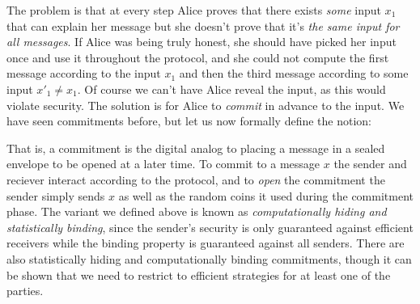 The problem is that at every step Alice proves that there exists
\emph{some} input \(x_1\) that can explain her message but she doesn't
prove that it's \emph{the same input for all messages}. If Alice was
being truly honest, she should have picked her input once and use it
throughout the protocol, and she could not compute the first message
according to the input \(x_1\) and then the third message according to
some input \(x'_1 \neq x_1\). Of course we can't have Alice reveal the
input, as this would violate security. The solution is for Alice to
\emph{commit} in advance to the input. We have seen commitments before,
but let us now formally define the notion:

\hypertarget{commitmentdef}{}

That is, a commitment is the digital analog to placing a message in a
sealed envelope to be opened at a later time. To commit to a message
\(x\) the sender and reciever interact according to the protocol, and to
\emph{open} the commitment the sender simply sends \(x\) as well as the
random coins it used during the commitment phase. The variant we defined
above is known as \emph{computationally hiding and statistically
binding}, since the sender's security is only guaranteed against
efficient receivers while the binding property is guaranteed against all
senders. There are also statistically hiding and computationally binding
commitments, though it can be shown that we need to restrict to
efficient strategies for at least one of the parties.

